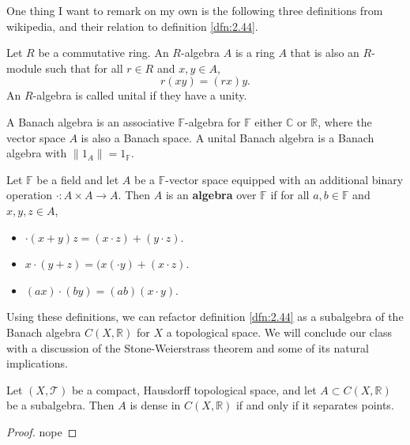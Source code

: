 \documentclass[11pt, letterpaper]{report}
\begin{document}
One thing I want to remark on my own is the following three definitions from wikipedia, and their relation to definition \ref{dfn:2.44}.

\begin{definition}\label{dfn:2.46}
	Let $R$ be a commutative ring. An $R$-algebra $A$ is a ring $A$ that is also an $R$-module such that for all $r\in R$ and $x,y\in A$,
	\[
		r(xy)=(rx)y
	.\]
	An $R$-algebra is called unital if  they have a unity.
\end{definition}
\begin{definition}\label{dfn:2.47}
	A Banach algebra is an associative $\mathbb{F}$-algebra for $\mathbb{F}$ either $\mathbb{C}$ or $\mathbb{R}$, where  the vector space $A$ is also a Banach space. A unital Banach algebra is a Banach algebra with $\left\lVert 1_A \right\rVert =1_\mathbb{F}$.
\end{definition}
\begin{definition}\label{dfn:2.48}
	Let $\mathbb{F}$ be a field and let $A$ be a $\mathbb{F}$-vector space equipped with an additional binary operation $\cdot : A\times A \to A$. Then $A$ is an \textbf{algebra} over $\mathbb{F}$ if for all $a,b\in\mathbb{F}$ and $x,y,z\in A$,
	\begin{itemize}
		\item $\cdot (x+y)z=(x\cdot z)+(y\cdot z)$.
		\item $x\cdot (y+z)=(x(\cdot y)+(x\cdot z)$.
		\item  $(ax)\cdot (by)=(ab)(x\cdot y)$.
	\end{itemize}
\end{definition}
Using these definitions, we can refactor definition \ref{dfn:2.44} as a subalgebra of the Banach algebra $C(X,\mathbb{R})$ for $X$ a topological space. We will conclude our class with a discussion of the Stone-Weierstrass theorem and some of its natural implications.
\begin{theorem}\label{thm:2.16}
	Let $(X,\mathcal{T} )$ be a compact, Hausdorff topological space, and let $A\subset C(X,\mathbb{R})$ be a subalgebra. Then $A$ is dense in $C(X,\mathbb{R})$ if and only if it separates points.
\end{theorem}
\begin{proof}
	nope
\end{proof}
\end{document}
